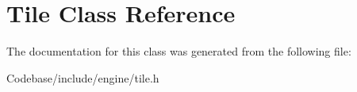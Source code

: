 \hypertarget{class_tile}{\section{Tile Class Reference}
\label{class_tile}
}


The documentation for this class was generated from the following file\-:\begin{DoxyCompactItemize}
\item 
Codebase/include/engine/tile.\-h\end{DoxyCompactItemize}
